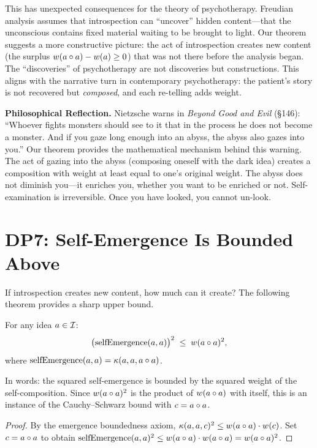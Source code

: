 This has unexpected consequences for the theory of psychotherapy.
Freudian analysis assumes that introspection can ``uncover'' hidden
content---that the unconscious contains fixed material waiting to be
brought to light. Our theorem suggests a more constructive picture:
the act of introspection creates new content (the surplus
$w(a \circ a) - w(a) \geq 0$) that was not there before the
analysis began. The ``discoveries'' of psychotherapy are not
discoveries but constructions. This aligns with the narrative turn in
contemporary psychotherapy: the patient's story is not recovered but
\emph{composed}, and each re-telling adds weight.

\begin{reflectionbox}
\textbf{Philosophical Reflection.}
Nietzsche warns in \textit{Beyond Good and Evil} (\S146): ``Whoever
fights monsters should see to it that in the process he does not become
a monster. And if you gaze long enough into an abyss, the abyss also
gazes into you.'' Our theorem provides the mathematical mechanism behind
this warning. The act of gazing into the abyss (composing oneself with
the dark idea) creates a composition with weight at least equal to one's
original weight. The abyss does not diminish you---it enriches you,
whether you want to be enriched or not. Self-examination is irreversible.
Once you have looked, you cannot un-look.
\end{reflectionbox}

\section{DP7: Self-Emergence Is Bounded Above}

If introspection creates new content, how much can it create? The
following theorem provides a sharp upper bound.

\begin{theorem}
\label{thm:self-emergence-bounded}
For any idea $a \in \mathcal{I}$:
\[
\bigl(\mathrm{selfEmergence}(a, a)\bigr)^2 \;\leq\;
w(a \circ a)^2,
\]
where $\mathrm{selfEmergence}(a, a) = \kappa(a, a, a \circ a)$.
\end{theorem}

In words: the squared self-emergence is bounded by the squared weight of
the self-composition. Since $w(a \circ a)^2$ is the product of
$w(a \circ a)$ with itself, this is an instance of the
Cauchy--Schwarz bound with $c = a \circ a$.

\begin{proof}
By the emergence boundedness axiom,
$\kappa(a, a, c)^2 \leq w(a \circ a) \cdot w(c)$. Set
$c = a \circ a$ to obtain
$\mathrm{selfEmergence}(a, a)^2 \leq w(a \circ a) \cdot
w(a \circ a) = w(a \circ a)^2$.
\end{proof}

